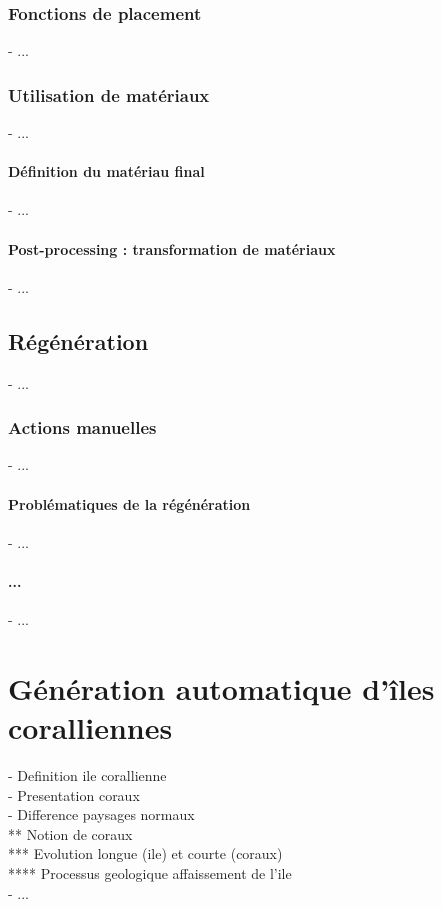 \subsection{Fonctions de placement}
- ...

\subsection{Utilisation de matériaux}
- ...

\subsubsection{Définition du matériau final}
- ...

\subsubsection{Post-processing : transformation de matériaux}
- ...


\section{Régénération}
- ...

\subsection{Actions manuelles}
- ...

\subsubsection{Problématiques de la régénération}
- ...

\subsubsection{...}
- ...


\chapter{Génération automatique d'îles coralliennes}
\minitoc

- Definition ile corallienne \\
- Presentation coraux \\
- Difference paysages normaux \\
** Notion de coraux \\
*** Evolution longue (ile) et courte (coraux) \\
**** Processus geologique affaissement de l'ile \\
- ...

